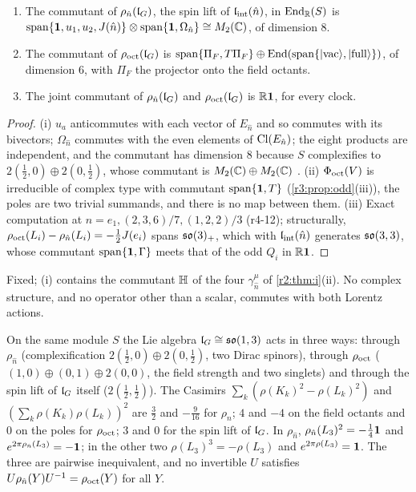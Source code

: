 \begin{proposition}[Commutants]
\label{r4:prop:comm}
\begin{enumerate}[label=(\roman*),leftmargin=2.2em]
\item The commutant of $\rho_{\hat n}(\mathfrak l_G)$, the spin lift of $\mathfrak l_{\rm int}(\hat n)$, in $\operatorname{End}_{\mathbb{R}}(S)$ is $\operatorname{span}\{\mathbf 1,u_1,u_2,J(\hat n)\}\otimes\operatorname{span}\{\mathbf 1,\Omega_{\hat n}\}\cong M_2(\mathbb{C})$,
of dimension $8$.
\item The commutant of $\rho_{\rm oct}(\mathfrak l_G)$ is $\operatorname{span}\{\Pi_F,T\Pi_F\}\oplus\operatorname{End}(\operatorname{span}\{|\mathrm{vac}\rangle,|\mathrm{full}\rangle\})$, of dimension $6$, with $\Pi_F$
the projector onto the field octants.
\item The joint commutant of $\rho_{\hat n}(\mathfrak l_G)$ and $\rho_{\rm oct}(\mathfrak l_G)$ is $\mathbb{R}\mathbf 1$, for every clock.
\end{enumerate}
\end{proposition}

\begin{proof}
(i) $u_a$ anticommutes with each vector of $E_{\hat n}$ and so commutes with its bivectors; $\Omega_{\hat n}$ commutes with the even elements of $\mathrm{Cl}(E_{\hat n})$; the eight
products are independent, and the commutant has dimension $8$ because $S$ complexifies to $2(\tfrac12,0)\oplus2(0,\tfrac12)$, whose commutant is
$M_2(\mathbb{C})\oplus M_2(\mathbb{C})$ \cite{GoodmanWallach}. (ii) $\Phi_{\rm oct}(V)$ is irreducible of complex type with commutant $\operatorname{span}\{\mathbf 1,T\}$ (\cref{r3:prop:odd}(iii)), the poles are two
trivial summands, and there is no map between them. (iii) Exact computation at $\hat n=e_1,(2,3,6)/7,(1,2,2)/3$ (r4-12); structurally, $\rho_{\rm oct}(L_i)-\rho_{\hat n}(L_i)=-\tfrac12J(e_i)$
spans $\mathfrak{so}(3)_+$, which with $\mathfrak l_{\rm int}(\hat n)$ generates $\mathfrak{so}(3,3)$, whose commutant $\operatorname{span}\{\mathbf 1,\Gamma\}$ meets that of the odd $Q_i$ in $\mathbb{R}\mathbf 1$.
\end{proof}

Fixed; (i) contains the commutant $\mathbb{H}$ of the four $\gamma^\mu_{\hat n}$ of \cref{r2:thm:i}(ii). No complex structure, and no operator other than a scalar,
commutes with both Lorentz actions.

\begin{proposition}
\label{r4:prop:ineq}
On the same module $S$ the Lie algebra $\mathfrak l_G\cong\mathfrak{so}(1,3)$ acts in three ways: through $\rho_{\hat n}$ (complexification $2(\tfrac12,0)\oplus2(0,\tfrac12)$, two
Dirac spinors), through $\rho_{\rm oct}$ ($(1,0)\oplus(0,1)\oplus2(0,0)$, the field strength and two singlets) and through the spin lift of $\mathfrak l_G$ itself
($2(\tfrac12,\tfrac12)$). The Casimirs $\sum_k(\rho(K_k)^2-\rho(L_k)^2)$ and $(\sum_k\rho(K_k)\rho(L_k))^2$ are $\tfrac32$ and $-\tfrac9{16}$ for $\rho_{\hat n}$; $4$ and $-4$ on the field
octants and $0$ on the poles for $\rho_{\rm oct}$; $3$ and $0$ for the spin lift of $\mathfrak l_G$. In $\rho_{\hat n}$, $\rho_{\hat n}(L_3)^2=-\tfrac14\mathbf 1$ and $e^{2\pi\rho_{\hat n}(L_3)}=-\mathbf 1$; in the other two
$\rho(L_3)^3=-\rho(L_3)$ and $e^{2\pi\rho(L_3)}=\mathbf 1$. The three are pairwise inequivalent, and no invertible $U$ satisfies $U\rho_{\hat n}(Y)U^{-1}=\rho_{\rm oct}(Y)$
for all $Y$.
\end{proposition}

